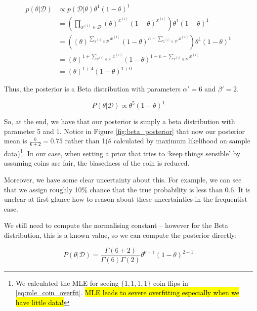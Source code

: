 \begin{align*}
    p(\theta|\mathcal{D}) & \propto p(\mathcal{D}|\theta)\theta^{1}(1-\theta)^{1}                                                                                   \\
                          & = \left(\prod_{x^{(i)}\in\mathcal{D}}(\theta)^{x^{(i)}}(1-\theta)^{x^{(i)}}\right)\theta^{1}(1-\theta)^{1}                              \\
                          & = \left((\theta)^{\sum_{x^{(i)}\in\mathcal{D}}x^{(i)}}(1-\theta)^{n-\sum_{x^{(i)}\in\mathcal{D}}x^{(i)}}\right)\theta^{1}(1-\theta)^{1} \\
                          & = (\theta)^{1+\sum_{x^{(i)}\in\mathcal{D}}x^{(i)}}(1-\theta)^{1+n-\sum_{x^{(i)}\in\mathcal{D}}x^{(i)}}                                  \\
                          & = (\theta)^{1+4}(1-\theta)^{1+0}
\end{align*}



\bigskip
Thus, the posterior is a Beta distribution with parameters \( \alpha' = 6 \) and \( \beta' = 2 \).

\[
    P(\theta|\mathcal{D}) \propto \theta^{5}(1-\theta)^{1}
\]

So, at the end, we have that our posterior is simply a beta distribution with parameter 5 and 1. Notice in Figure \ref{fig:beta_posterior} that now our posterior mean is $\frac{6}{6+2} = 0.75$ rather than 1($\theta$ calculated by maximum likelihood on sample data)\footnote{We calculated the MLE for seeing $\{1,1,1,1\}$ coin flips in \ref{eq:mle_coin_overfit}. \hl{MLE leads to severe overfitting especially when we have little data!}}. In our case, when setting a prior that tries to `keep things sensible' by assuming coins are fair, the biasedness of the coin is reduced. \bigskip


Moreover, we have some clear uncertainty about this. For example, we can see that we assign roughly 10\% chance that the true probability is less than 0.6. It is unclear at first glance how to reason about these uncertainties in the frequentist case. \bigskip

We still need to compute the normalising constant – however for the Beta distribution, this is a known value, so we can compute the posterior directly:

\[
    P(\theta|\mathcal{D}) = \frac{\Gamma(6+2)}{\Gamma(6)\Gamma(2)} \theta^{6-1} (1-\theta)^{2-1}
\]

